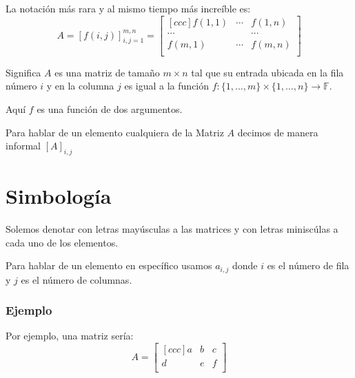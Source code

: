 \documentclass[12pt]{report}                                    %
\begin{document}
                La notación más rara y al mismo tiempo más increíble es:
                \begin{equation}
                    A   = [f(i,j)]_{i, j = 1}^{m, n}
                        =
                        \begin{bmatrix}[ccc]
                            f(1,1)  & \cdots & f(1,n)   \\
                            \cdots  &        & \cdots   \\
                            f(m, 1) & \cdots & f(m,n)   \\
                        \end{bmatrix}
                \end{equation}

                Significa $A$ es una matriz de tamaño $m \times n$ tal que su entrada
                ubicada en la fila número $i$ y en la columna $j$ es igual a la función
                $f: \{1, \dots, m\} \times \{1, \dots, n\} \to \mathbb{F}$.
                
                Aquí $f$ es una función de dos argumentos.
                
                Para hablar de un elemento cualquiera de la Matriz $A$ decimos de manera
                informal $[A]_{i,j}$


        \clearpage
        \section{Simbología}

            Solemos denotar con letras mayúsculas a las matrices y con letras miniscúlas
            a cada uno de los elementos.

            Para hablar de un elemento en específico usamos $a_{i,j}$ donde $i$ es el
            número de fila y $j$ es el número de columnas.


            \subsubsection*{Ejemplo}

                Por ejemplo, una matriz sería:
                \begin{equation*}
                    A =
                    \begin{bmatrix}[ccc]
                        a & b & c   \\
                        d & e & f   \\
                    \end{bmatrix}
                \end{equation*}
\end{document}
